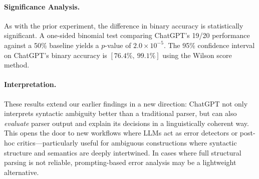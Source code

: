 \paragraph{Significance Analysis.}
As with the prior experiment, the difference in binary accuracy is statistically significant. A one-sided binomial test comparing ChatGPT’s 19/20 performance against a 50\% baseline yields a $p$-value of $2.0 \times 10^{-5}$. The 95\% confidence interval on ChatGPT’s binary accuracy is $[76.4\%,\ 99.1\%]$ using the Wilson score method.

\paragraph{Interpretation.}
These results extend our earlier findings in a new direction: ChatGPT not only interprets syntactic ambiguity better than a traditional parser, but can also \textit{evaluate} parser output and explain its decisions in a linguistically coherent way. This opens the door to new workflows where LLMs act as error detectors or post-hoc critics—particularly useful for ambiguous constructions where syntactic structure and semantics are deeply intertwined. In cases where full structural parsing is not reliable, prompting-based error analysis may be a lightweight alternative.

